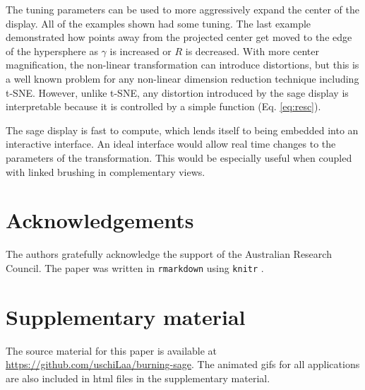 \documentclass[]{interact}
\theoremstyle{plain}%
\theoremstyle{definition}
\theoremstyle{remark}
\begin{document}
The tuning parameters can be used to more aggressively expand the center
of the display. All of the examples shown had some tuning. The last
example demonstrated how points away from the projected center get moved
to the edge of the hypersphere as \(\gamma\) is increased or \(R\) is
decreased. With more center magnification, the non-linear transformation
can introduce distortions, but this is a well known problem for any
non-linear dimension reduction technique including t-SNE. However,
unlike t-SNE, any distortion introduced by the sage display is
interpretable because it is controlled by a simple function (Eq.
\ref{eq:resc}).

The sage display is fast to compute, which lends itself to being
embedded into an interactive interface. An ideal interface would allow
real time changes to the parameters of the transformation. This would be
especially useful when coupled with linked brushing in complementary
views.

\hypertarget{acknowledgements}{%
\section*{Acknowledgements}\label{acknowledgements}}

The authors gratefully acknowledge the support of the Australian
Research Council. The paper was written in \texttt{rmarkdown}
\citep{rmarkdown} using \texttt{knitr} \citep{knitr}.

\hypertarget{supplementary-material}{%
\section*{Supplementary material}\label{supplementary-material}}

The source material for this paper is available at
\url{https://github.com/uschiLaa/burning-sage}. The animated gifs for
all applications are also included in html files in the supplementary
material.



\end{document}
